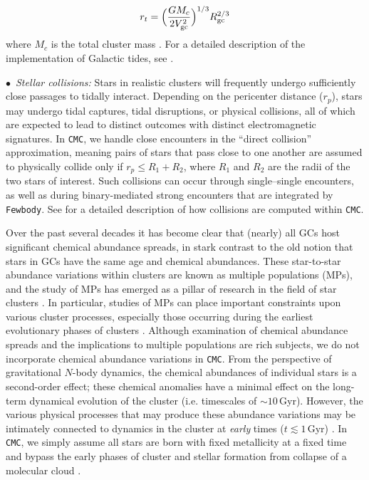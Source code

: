 \documentclass[twocolumn,tighten]{aastex63}
\begin{document}
    \begin{equation}
        r_t = \Big( \frac{G M_c}{2V_{\rm{gc}}^2} \Big)^{1/3} R_{\rm{gc}}^{2/3}
    \end{equation}
    where $M_c$ is the total cluster mass \citep[see, e.g.,][]{BaumgardtMakino2003}. For a detailed description of the implementation of Galactic tides, see \citet{Chatterjee2010,Pattabiraman2013}.
    
    $\bullet\,$ \textit{Stellar collisions:} Stars in realistic clusters will frequently undergo sufficiently close passages to tidally interact. Depending on the pericenter distance ($r_p$), stars may undergo tidal captures, tidal disruptions, or physical collisions, all of which are expected to lead to distinct outcomes with distinct electromagnetic signatures. In \texttt{CMC}, we handle close encounters in the ``direct collision'' approximation, meaning pairs of stars that pass close to one another are assumed to physically collide only if $r_p \leq R_1 + R_2$, where $R_1$ and $R_2$ are the radii of the two stars of interest. Such collisions can occur through single--single encounters, as well as during binary-mediated strong encounters that are integrated by \texttt{Fewbody}. See \citet{Fregeau2007} for a detailed description of how collisions are computed within \texttt{CMC}.
    
Over the past several decades it has become clear that (nearly) all GCs host significant chemical abundance spreads, in stark contrast to the old notion that stars in GCs have the same age and chemical abundances. These star-to-star abundance variations within clusters are known as multiple populations (MPs), and the study of MPs has emerged as a pillar of research in the field of star clusters \citep[for a recent review, see][]{Bastian2018}. In particular, studies of MPs can place important constraints upon various cluster processes, especially those occurring during the earliest evolutionary phases of clusters \citep[e.g.,][]{Ventura2001,Decressin2007,deMink2009,Denissenkov2014,Gieles2018}.
Although examination of chemical abundance spreads and the implications to multiple populations are rich subjects, we do not incorporate chemical abundance variations in \texttt{CMC}. From the perspective of gravitational $N$-body dynamics, the chemical abundances of individual stars is a second-order effect; these chemical anomalies have a minimal effect on the long-term dynamical evolution of the cluster (i.e. timescales of $\sim10\,$Gyr). However, the various physical processes that may produce these abundance variations may be intimately connected to dynamics in the cluster at \textit{early} times ($t \lesssim 1\,$Gyr) \citep[e.g.,][]{Sills2010}. In \texttt{CMC}, we simply assume all stars are born with fixed metallicity at a fixed time and bypass the early phases of cluster and stellar formation from collapse of a molecular cloud \citep[for recent work which considers these processes, see e.g.,][]{Fujii2016}. 
\end{document}
